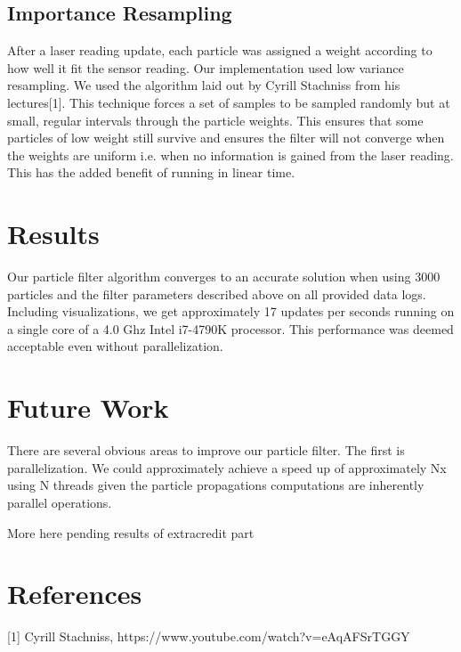 \documentclass{article}
\begin{document}
\subsection{Importance Resampling}

After a laser reading update, each particle was assigned a weight according to how well it fit the sensor reading. Our implementation used low variance resampling. We used the algorithm laid out by Cyrill Stachniss from his lectures[1].  This technique forces a set of samples to be sampled randomly but at small, regular intervals through the particle weights. This ensures that some particles of low weight still survive and ensures the filter will not converge when the weights are uniform i.e. when no information is gained from the laser reading.  This has the added benefit of running in linear time.

\section{Results}

Our particle filter algorithm converges to an accurate solution when using 3000 particles and the filter parameters described above on all provided data logs.  Including visualizations, we get approximately 17 updates per seconds running on a single core of a 4.0 Ghz Intel i7-4790K processor. This performance was deemed acceptable even without parallelization.

\section{Future Work}

There are several obvious areas to improve our particle filter.  The first is parallelization. We could approximately achieve a speed up of approximately Nx using N threads given the particle propagations computations are inherently parallel operations.

More here pending results of extracredit part

\section{References}
[1] Cyrill Stachniss,  https://www.youtube.com/watch?v=eAqAFSrTGGY
\end{document}
